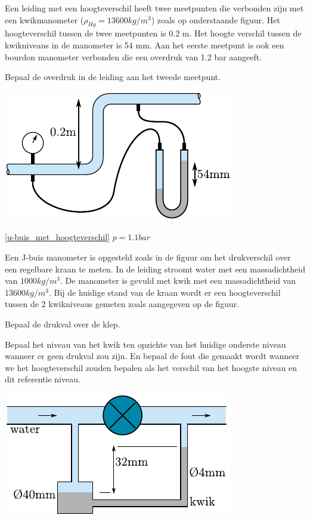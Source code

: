 \begin{toepassing}[*]
	\label{u-buis_met_hoogteverschil}
Een leiding met een hoogteverschil heeft twee meetpunten die verbonden zijn met een kwikmanometer ($\rho_{Hg}=13600\unit{kg/m^3}$) zoals op onderstaande figuur. Het hoogteverschil tussen de twee meetpunten is 0.2 m. Het hoogte verschil tussen de kwikniveaus in de manometer is 54 mm. Aan het eerste meetpunt is ook een bourdon manometer verbonden die een overdruk van 1.2 bar aangeeft.
		
Bepaal de overdruk in de leiding aan het tweede meetpunt.

	\centering
	\includegraphics{fig/hydrostatica/u-buis_met_hoogteverschil}
\end{toepassing}
\begin{antwoord}{\ref{u-buis_met_hoogteverschil}}
	$p = 1.1\unit{bar}$
\end{antwoord}
\begin{toepassing}
	\label{J-buis}
Een J-buis manometer is opgesteld zoals in de figuur om het drukverschil over een regelbare kraan te meten. In de leiding stroomt water met een massadichtheid van $1000\unit{kg/m^3}$. De manometer is gevuld met kwik met een massadichtheid van $13600\unit{kg/m^3}$. Bij de huidige stand van de kraan wordt er een hoogteverschil tussen de 2 kwikniveaus gemeten zoals aangegeven op de figuur.
		
Bepaal de drukval over de klep.
		
Bepaal het niveau van het kwik ten opzichte van het huidige onderste niveau wanneer er geen drukval zou zijn. En bepaal de fout die gemaakt wordt wanneer we het hoogteverschil zouden bepalen als het verschil van het hoogste niveau en dit referentie niveau.

	\centering
	\includegraphics{fig/hydrostatica/J-buis}
\end{toepassing}
